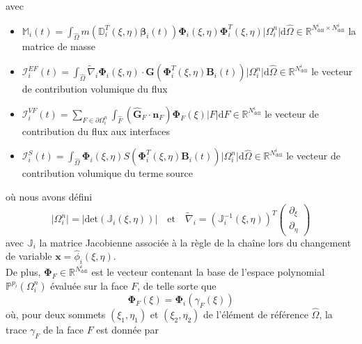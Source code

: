 \documentclass[11pt, a4paper, oneside]{report}
\begin{document}
avec
\begin{itemize}
    \item $\displaystyle \mathbb{M}_i(t) = \int_{\widehat{\Omega}} m \left( \mathbb{D}_i^T(\xi, \eta) \bm{\beta}_i(t) \right) \bm{\Phi}_i(\xi, \eta) \bm{\Phi}_i^T(\xi, \eta) \lvert \Omega_i^n \rvert \text{d}\widehat{\Omega} \in \mathbb{R}^{N_\text{ddl}^i \times N_\text{ddl}^i}$ la matrice de masse
    \item $\displaystyle \bm{\mathcal{I}}_i^{EF}(t) = \int_{\widehat{\Omega}} \widetilde{\nabla}_i \bm{\Phi}_i(\xi, \eta) \cdot \bm{G} \left( \bm{\Phi}_i^T(\xi, \eta) \bm{B}_i(t) \right) \lvert \Omega_i^n \rvert \text{d}\widehat{\Omega} \in \mathbb{R}^{N_\text{ddl}^i}$ le vecteur de contribution volumique du flux
    \item $\displaystyle \bm{\mathcal{I}}_i^{VF}(t) = \sum_{F \in \partial \Omega_i^n} \int_{\widehat{F}} \left( \bm{\widehat{G}}_F \cdot \bm{n}_F \right) \bm{\Phi}_F(\xi) \lvert F \rvert \text{d}\widehat{F} \in \mathbb{R}^{N_\text{ddl}^i}$ le vecteur de contribution du flux aux interfaces
    \item $\displaystyle \bm{\mathcal{I}}_i^S(t) = \int_{\widehat{\Omega}} \bm{\Phi}_i(\xi, \eta) S \left( \bm{\Phi}_i^T(\xi, \eta) \bm{B}_i(t) \right) \lvert \Omega_i^n \rvert \text{d}\widehat{\Omega} \in \mathbb{R}^{N_\text{ddl}^i}$ le vecteur de contribution volumique du terme source
\end{itemize}
où nous avons défini
\begin{equation}
    \lvert \Omega_i^n \rvert = \left| \text{det}\left( \mathbb{J}_i(\xi, \eta) \right) \right| \quad \text{et} \quad \widetilde{\nabla}_i = \left( \mathbb{J}_i^{-1}(\xi, \eta) \right)^T \begin{pmatrix} \partial_\xi \\ \partial_\eta \end{pmatrix}
\end{equation}
avec $\mathbb{J}_i$ la matrice Jacobienne associée à la règle de la chaîne lors du changement de variable $\bm{x} = \widehat{\phi}_i(\xi, \eta)$. \\
De plus, $\bm{\Phi}_F \in \mathbb{R}^{N_\text{ddl}^i}$ est le vecteur contenant la base de l'espace polynomial $\mathbb{P}^{p_i}(\Omega_i^n)$ évaluée sur la face $F$, de telle sorte que
\begin{equation}
    \bm{\Phi}_F(\xi) = \bm{\Phi}_i \left( \gamma_F(\xi) \right)
\end{equation}
où, pour deux sommets $(\xi_1, \eta_1)$ et $(\xi_2, \eta_2)$ de l'élément de référence $\widehat{\Omega}$, la trace $\gamma_F$ de la face $F$ est donnée par
\end{document}
